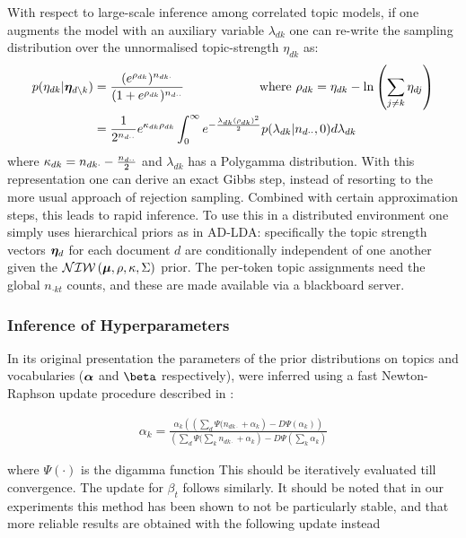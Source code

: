 With respect to large-scale inference among correlated topic models, if one augments the model with an auxiliary variable $\lambda_{dk}$ one can re-write the sampling distribution over the unnormalised topic-strength $\eta_{dk}$ as:
\begin{align}
p(\eta_{dk} | \bm \eta_{d\setminus k}) & = \frac{(e^{\rho_{dk}})^{n_{dk\cdot}}}{(1 + e^{\rho_{dk}})^{n_{d\cdot\cdot}}} \qquad\qquad\qquad\text{where }\rho_{dk} = \eta_{dk} - \ln\left(\sum_{j \neq k} \eta_{dj}\right) \\
&= \frac{1}{2^{n_{d\cdot\cdot}}}
e^{\kappa_{dk} \rho_{dk}}
\int_0^\infty e^{-\frac{\lambda_{dk} (\rho_{dk})^2}{2}} p(\lambda_{dk}|n_{d\cdot\cdot},0) d\lambda_{dk} 
\end{align}
where $\kappa_{dk} = n_{dk\cdot} - \frac{n_{d\cdot\cdot}}{2}$ and $\lambda_{dk}$ has a Polygamma distribution. With this representation one can derive an exact Gibbs step, instead of resorting to the more usual approach of rejection sampling. Combined with certain approximation steps, this leads to rapid inference\cite{Chen2013}. To use this in a distributed environment one simply uses hierarchical priors as in AD-LDA: specifically the topic strength vectors $\bm \eta_d$ for each document $d$ are conditionally independent of one another given the $\mathcal{NIW}\left(\bm \mu, \rho, \kappa, \Sigma\right)$ prior. The per-token topic assignments need the global $n_{\cdot k t}$ counts, and these are made available via a blackboard server.

\subsubsection*{Inference of Hyperparameters}
In its original presentation\cite{BleiNgJordan2003} the parameters of the prior distributions on topics and vocabularies ($\bm \alpha$ and $\vv{\beta}$ respectively), were inferred using a fast Newton-Raphson update procedure described in \cite{Minka2000}:

\begin{align}
\alpha_k = \frac{\alpha_k \left( \left(\sum_d \Psi(n_{dk\cdot} + \alpha_k \right) - D \Psi (\alpha_k)\right)}{\left(\sum_d  \Psi(\sum_k n_{dk\cdot} + \alpha_k \right) - D \Psi (\sum_k \alpha_k)}
\end{align}

where $\Psi(\cdot)$ is the digamma function This should be iteratively evaluated till convergence. The update for $\beta_t$ follows similarly. It should be noted that in our experiments this method has been shown to not be particularly stable, and that more reliable results are obtained with the following update instead

